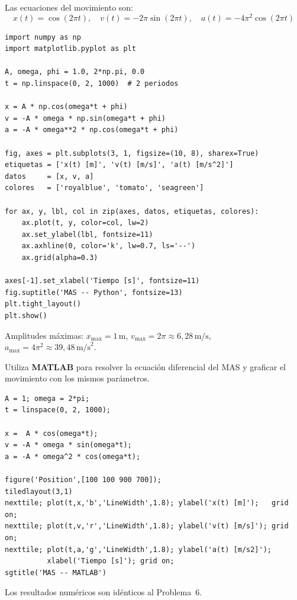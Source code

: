 \documentclass[12pt, a4paper, oneside]{book}
\newcommand{\ms}{\,\text{m/s}}
\newcommand{\mss}{\,\text{m/s}^{2}}
\newcommand{\mts}{\,\text{m}}
\begin{document}
\begin{solucion}
Las ecuaciones del movimiento son:
\[
  x(t) = \cos(2\pi t),\quad
  v(t) = -2\pi\sin(2\pi t),\quad
  a(t) = -4\pi^{2}\cos(2\pi t)
\]

\begin{lstlisting}[caption={Simulaci\'on MAS en Python --- Problema 6}]
import numpy as np
import matplotlib.pyplot as plt

A, omega, phi = 1.0, 2*np.pi, 0.0
t = np.linspace(0, 2, 1000)  # 2 periodos

x = A * np.cos(omega*t + phi)
v = -A * omega * np.sin(omega*t + phi)
a = -A * omega**2 * np.cos(omega*t + phi)

fig, axes = plt.subplots(3, 1, figsize=(10, 8), sharex=True)
etiquetas = ['x(t) [m]', 'v(t) [m/s]', 'a(t) [m/s^2]']
datos     = [x, v, a]
colores   = ['royalblue', 'tomato', 'seagreen']

for ax, y, lbl, col in zip(axes, datos, etiquetas, colores):
    ax.plot(t, y, color=col, lw=2)
    ax.set_ylabel(lbl, fontsize=11)
    ax.axhline(0, color='k', lw=0.7, ls='--')
    ax.grid(alpha=0.3)

axes[-1].set_xlabel('Tiempo [s]', fontsize=11)
fig.suptitle('MAS -- Python', fontsize=13)
plt.tight_layout()
plt.show()
\end{lstlisting}

\begin{resultado}
Amplitudes m\'aximas:
$x_{\max} = 1\mts$,
$v_{\max} = 2\pi \approx 6{,}28\ms$,
$a_{\max} = 4\pi^{2} \approx 39{,}48\mss$.
\end{resultado}
\end{solucion}

\begin{problema}[title={Problema~7}]
Utiliza \textbf{MATLAB} para resolver la ecuaci\'on diferencial del MAS y graficar
el movimiento con los mismos par\'ametros.
\end{problema}

\begin{solucion}
\begin{lstlisting}[style=matlab, caption={Simulaci\'on MAS en MATLAB --- Problema 7}]
A = 1; omega = 2*pi;
t = linspace(0, 2, 1000);

x =  A * cos(omega*t);
v = -A * omega * sin(omega*t);
a = -A * omega^2 * cos(omega*t);

figure('Position',[100 100 900 700]);
tiledlayout(3,1)
nexttile; plot(t,x,'b','LineWidth',1.8); ylabel('x(t) [m]');   grid on;
nexttile; plot(t,v,'r','LineWidth',1.8); ylabel('v(t) [m/s]'); grid on;
nexttile; plot(t,a,'g','LineWidth',1.8); ylabel('a(t) [m/s2]');
          xlabel('Tiempo [s]'); grid on;
sgtitle('MAS -- MATLAB')
\end{lstlisting}
Los resultados num\'ericos son id\'enticos al Problema~6.
\end{solucion}
\end{document}
